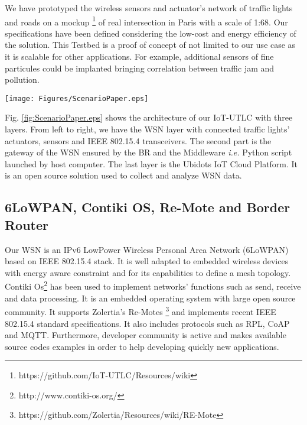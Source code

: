 We have prototyped the wireless sensors and actuator's network of traffic lights and roads on a mockup \footnote{https://github.com/IoT-UTLC/Resources/wiki} of real intersection in Paris with a scale of 1:68. Our specifications have been defined considering the low-cost and energy efficiency of the solution. This Testbed is a proof of concept of not limited to our use case as it is scalable for other applications. For example, additional sensors of fine particules could be implanted bringing correlation between traffic jam and pollution. 
\begin{figure*}[!htb]
\centering
\texttt{[image: Figures/ScenarioPaper.eps]}
\caption{Architecture of  Iot-UTLC}
\label{fig:ScenarioPaper.eps}
\end{figure*}


Fig. \ref{fig:ScenarioPaper.eps} shows the architecture of our IoT-UTLC with three layers. From left to right, we have the WSN layer with connected traffic lights’ actuators, sensors and IEEE 802.15.4 transceivers. The second part is the gateway of the WSN ensured by the BR and the Middleware \emph{i.e.} Python script launched by host computer. 
The last layer is the Ubidots IoT Cloud Platform. It is an open source solution used to collect and analyze WSN data. 



\subsection{6LoWPAN, Contiki OS, Re-Mote and Border Router} \label{Sec:Contiki}

Our WSN is an IPv6 LowPower Wireless Personal Area Network (6LoWPAN) based on IEEE 802.15.4 stack.
It is well adapted to embedded wireless devices with energy aware constraint and for its capabilities to define a mesh topology. Contiki Os\footnote{http://www.contiki-os.org/} has been used to implement networks' functions such as send, receive and data processing. 
It is an embedded operating system with large open source community. It supports Zolertia's Re-Motes \footnote{https://github.com/Zolertia/Resources/wiki/RE-Mote} and implements recent IEEE 802.15.4 standard specifications. It also includes protocols such as RPL, CoAP and MQTT. Furthermore, developer community is active and makes available source codes examples in order to help developing quickly new applications.

